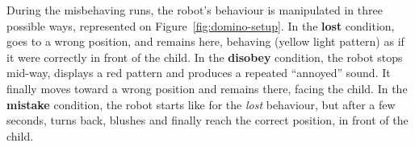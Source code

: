 \documentclass{sig-alternate}
\begin{document}
%
%
%
%
%
%
%
During the misbehaving runs, the robot's behaviour is manipulated in three
possible ways, represented on Figure~\ref{fig:domino-setup}.
In the \textbf{lost} condition, goes to a wrong position, and remains here,
behaving (yellow light pattern) as if it were correctly in front of the child.
In the \textbf{disobey} condition, the robot stops mid-way, displays a red
pattern and produces a repeated ``annoyed'' sound. It finally moves toward a
wrong position and remains there, facing the child. In the \textbf{mistake}
condition, the robot starts like for the \emph{lost} behaviour, but after a few
seconds, turns back, blushes and finally reach the correct position, in front of
the child.
\end{document}
